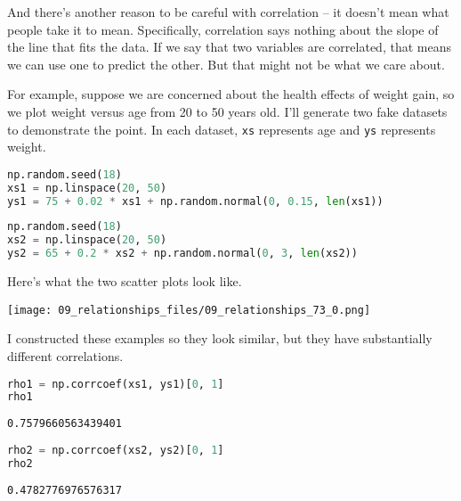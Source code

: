 And there's another reason to be careful with correlation -- it doesn't
mean what people take it to mean. Specifically, correlation says nothing
about the slope of the line that fits the data. If we say that two
variables are correlated, that means we can use one to predict the
other. But that might not be what we care about.

For example, suppose we are concerned about the health effects of weight
gain, so we plot weight versus age from 20 to 50 years old. I'll
generate two fake datasets to demonstrate the point. In each dataset,
\passthrough{\lstinline!xs!} represents age and
\passthrough{\lstinline!ys!} represents weight.

\begin{lstlisting}[language=Python,style=source]
np.random.seed(18)
xs1 = np.linspace(20, 50)
ys1 = 75 + 0.02 * xs1 + np.random.normal(0, 0.15, len(xs1))
\end{lstlisting}

\begin{lstlisting}[language=Python,style=source]
np.random.seed(18)
xs2 = np.linspace(20, 50)
ys2 = 65 + 0.2 * xs2 + np.random.normal(0, 3, len(xs2))
\end{lstlisting}

Here's what the two scatter plots look like.



\begin{center}
\texttt{[image: 09\_relationships\_files/09\_relationships\_73\_0.png]}
\end{center}

I constructed these examples so they look similar, but they have
substantially different correlations.

\begin{lstlisting}[language=Python,style=source]
rho1 = np.corrcoef(xs1, ys1)[0, 1]
rho1
\end{lstlisting}

\begin{lstlisting}[style=output]
0.7579660563439401
\end{lstlisting}

\begin{lstlisting}[language=Python,style=source]
rho2 = np.corrcoef(xs2, ys2)[0, 1]
rho2
\end{lstlisting}

\begin{lstlisting}[style=output]
0.4782776976576317
\end{lstlisting}

